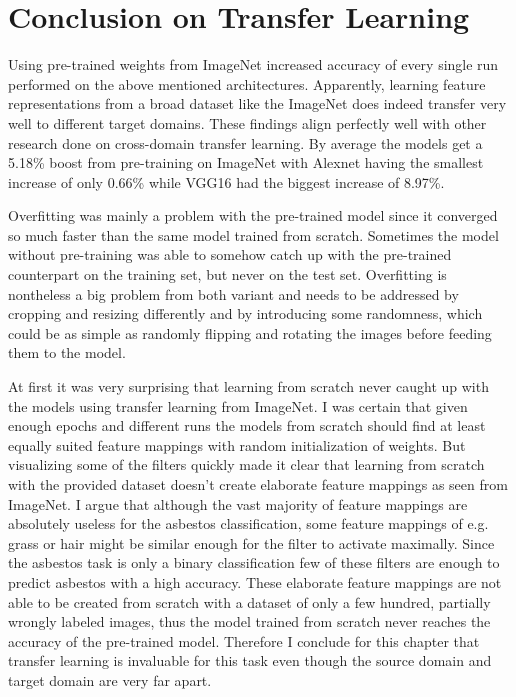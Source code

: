 \section{Conclusion on Transfer Learning}

Using pre-trained weights from ImageNet increased accuracy of every single run performed on the above mentioned architectures. Apparently, learning feature representations from a broad dataset like the ImageNet does indeed transfer very well to different target domains. These findings align perfectly well with other research done on cross-domain transfer learning. By average the models get a 5.18\% boost from pre-training on ImageNet with Alexnet having the smallest increase of only 0.66\% while VGG16 had the biggest increase of 8.97\%.

Overfitting was mainly a problem with the pre-trained model since it converged so much faster than the same model trained from scratch. Sometimes the model without pre-training was able to somehow catch up with the pre-trained counterpart on the training set, but never on the test set. Overfitting is nontheless a big problem from both variant and needs to be addressed by cropping and resizing differently and by introducing some randomness, which could be as simple as randomly flipping and rotating the images before feeding them to the model.

At first it was very surprising that learning from scratch never caught up with the models using transfer learning from ImageNet. I was certain that given enough epochs and different runs the models from scratch should find at least equally suited feature mappings with random initialization of weights. But visualizing  some of the filters quickly made it clear that learning from scratch  with the provided dataset doesn't create elaborate feature mappings as seen from ImageNet. I argue that although the vast majority of feature mappings are absolutely useless for the asbestos classification, some feature mappings of e.g. grass or hair might be similar enough for the filter to activate maximally. Since the asbestos task is only a binary classification few of these filters are enough to predict asbestos with a high accuracy. These elaborate feature mappings are not able to be created from scratch with a dataset of only a few hundred, partially wrongly labeled images, thus the model trained from scratch never reaches the accuracy of the pre-trained model. Therefore I conclude for this chapter that transfer learning is invaluable for this task even though the source domain and target domain are very far apart.


